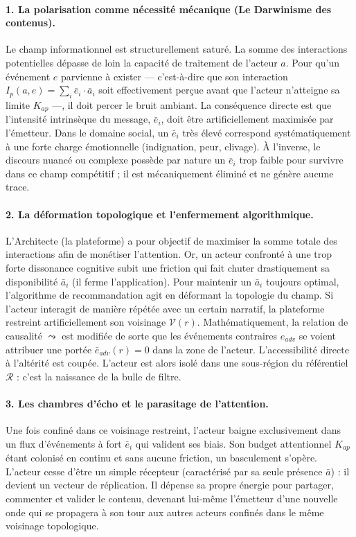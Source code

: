 \documentclass[11pt]{article}
\begin{document}
		\paragraph{1. La polarisation comme nécessité mécanique (Le Darwinisme des contenus).}
		Le champ informationnel est structurellement saturé. La somme des interactions potentielles dépasse de loin la capacité de traitement de l'acteur $a$. Pour qu'un événement $e$ parvienne à exister — c'est-à-dire que son interaction $I_p(a,e) = \sum_{i} \bar{e}_i \cdot \bar{a}_i$ soit effectivement perçue avant que l'acteur n'atteigne sa limite $K_{ap}$ —, il doit percer le bruit ambiant.
		La conséquence directe est que l'intensité intrinsèque du message, $\bar{e}_i$, doit être artificiellement maximisée par l'émetteur. Dans le domaine social, un $\bar{e}_i$ très élevé correspond systématiquement à une forte charge émotionnelle (indignation, peur, clivage). À l'inverse, le discours nuancé ou complexe possède par nature un $\bar{e}_i$ trop faible pour survivre dans ce champ compétitif ; il est mécaniquement éliminé et ne génère aucune trace.
		
		\paragraph{2. La déformation topologique et l'enfermement algorithmique.}
		L'Architecte (la plateforme) a pour objectif de maximiser la somme totale des interactions afin de monétiser l'attention. Or, un acteur confronté à une trop forte dissonance cognitive subit une friction qui fait chuter drastiquement sa disponibilité $\bar{a}_i$ (il ferme l'application).
		Pour maintenir un $\bar{a}_i$ toujours optimal, l'algorithme de recommandation agit en déformant la topologie du champ. Si l'acteur interagit de manière répétée avec un certain narratif, la plateforme restreint artificiellement son voisinage $\mathcal{V}(r)$. Mathématiquement, la relation de causalité $\leadsto$ est modifiée de sorte que les événements contraires $e_{adv}$ se voient attribuer une portée $\bar{e}_{adv}(r) = 0$ dans la zone de l'acteur. L'accessibilité directe à l'altérité est coupée. L'acteur est alors isolé dans une sous-région du référentiel $\mathcal{R}$ : c'est la naissance de la bulle de filtre.
		
		\paragraph{3. Les chambres d'écho et le parasitage de l'attention.}
		Une fois confiné dans ce voisinage restreint, l'acteur baigne exclusivement dans un flux d'événements à fort $\bar{e}_i$ qui valident ses biais. Son budget attentionnel $K_{ap}$ étant colonisé en continu et sans aucune friction, un basculement s'opère. L'acteur cesse d'être un simple récepteur (caractérisé par sa seule présence $\bar{a}$) : il devient un vecteur de réplication. Il dépense sa propre énergie pour partager, commenter et valider le contenu, devenant lui-même l'émetteur d'une nouvelle onde qui se propagera à son tour aux autres acteurs confinés dans le même voisinage topologique.
	
\end{document}
